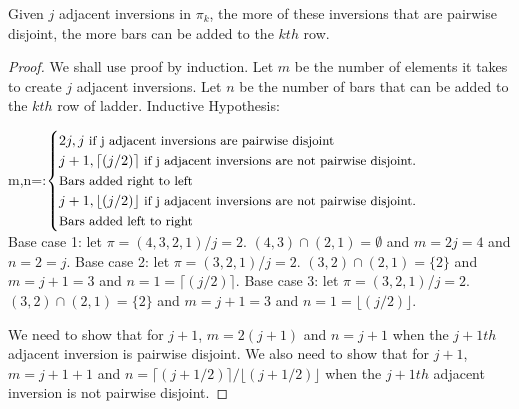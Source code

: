 \begin{lemma}
    Given $j$ adjacent inversions in $\pi_{k}$, the more of these inversions that are pairwise disjoint, the more 
    bars can be added to the $kth$ row.
\end{lemma}
\begin{proof}
    We shall use proof by induction. Let $m$ be the number of elements it takes to create $j$ adjacent inversions.
    Let $n$ be the number of bars that can be added to the $kth$ row of ladder.
    Inductive Hypothesis:\newline

    m,n=:$\begin{cases}
            2j,j \small{\mbox{ if j adjacent inversions are pairwise disjoint}}\\
            j+1,\lceil(j/2)\rceil \small{\mbox{ if j adjacent inversions are not pairwise disjoint.}}\\\small{\mbox{Bars added right to left}}\\
            j+1,\lfloor(j/2)\rfloor \small{\mbox{ if j adjacent inversions are not pairwise disjoint.}}\\\small{\mbox{Bars added left to right}}\\
        \end{cases}$\\



    Base case 1: let $\pi=(4,3,2,1)$/$j=2$. $(4,3) \cap (2,1) = \emptyset$ and $m=2j=4$ and $n=2=j$. \newline 
    Base case 2: let $\pi=(3,2,1)$/$j=2$. $(3,2) \cap (2,1)= \{2\}$ and $m=j+1=3$ and $n=1=\lceil(j/2)\rceil$.\newline
    Base case 3: let $\pi=(3,2,1)$/$j=2$. $(3,2) \cap (2,1)= \{2\}$ and $m=j+1=3$ and $n=1=\lfloor(j/2)\rfloor$.\newline



    We need to show that for $j+1$, $m=2(j+1)$ and $n=j+1$ when the $j+1th$ adjacent inversion is pairwise disjoint.
    We also need to show that for $j+1$, $m=j+1+1$ and $n=\lceil(j+1/2)\rceil/\lfloor(j+1/2)\rfloor$ when the $j+1th$ adjacent inversion is not pairwise 
    disjoint.\par




\end{proof}
